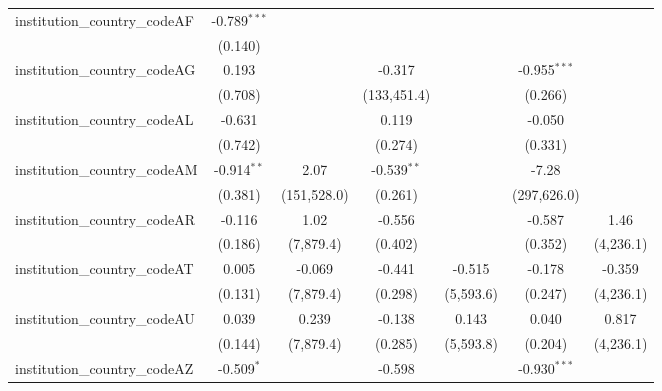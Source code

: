 \begin{tabular}{lcccccc}
   institution\_country\_codeAF          & -0.789$^{***}$ &               &                &               &                &   \\   
                                         & (0.140)        &               &                &               &                &   \\   
   institution\_country\_codeAG          & 0.193          &               & -0.317         &               & -0.955$^{***}$ &   \\   
                                         & (0.708)        &               & (133,451.4)    &               & (0.266)        &   \\   
   institution\_country\_codeAL          & -0.631         &               & 0.119          &               & -0.050         &   \\   
                                         & (0.742)        &               & (0.274)        &               & (0.331)        &   \\   
   institution\_country\_codeAM          & -0.914$^{**}$  & 2.07          & -0.539$^{**}$  &               & -7.28          &   \\   
                                         & (0.381)        & (151,528.0)   & (0.261)        &               & (297,626.0)    &   \\   
   institution\_country\_codeAR          & -0.116         & 1.02          & -0.556         &               & -0.587         & 1.46\\   
                                         & (0.186)        & (7,879.4)     & (0.402)        &               & (0.352)        & (4,236.1)\\   
   institution\_country\_codeAT          & 0.005          & -0.069        & -0.441         & -0.515        & -0.178         & -0.359\\   
                                         & (0.131)        & (7,879.4)     & (0.298)        & (5,593.6)     & (0.247)        & (4,236.1)\\   
   institution\_country\_codeAU          & 0.039          & 0.239         & -0.138         & 0.143         & 0.040          & 0.817\\   
                                         & (0.144)        & (7,879.4)     & (0.285)        & (5,593.8)     & (0.204)        & (4,236.1)\\   
   institution\_country\_codeAZ          & -0.509$^{*}$   &               & -0.598         &               & -0.930$^{***}$ &   \\   

\end{tabular}
